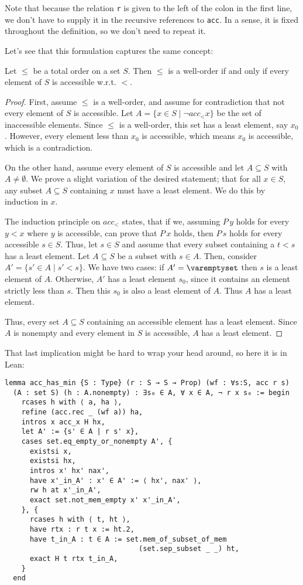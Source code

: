 \documentclass[a4paper, 12pt]{article}
\newcommand{\lean}[1]{\texttt{#1}}
\theoremstyle{changedot}
\theoremstyle{changedotbreak}
\theoremstyle{nonumberplain}
\newtheorem{proof}{Proof}
\begin{document}
Note that because the relation \lean{r} is given to the left of the colon in the first line, we don't have to supply it in the recursive references to \lean{acc}. In a sense, it is fixed throughout the definition, so we don't need to repeat it.

Let's see that this formulation captures the same concept:

\begin{theorem}\label{thm:wf_iff_wo}
  Let $\leq$ be a total order on a set $S$. Then $\leq$ is a well-order if and only if every element of $S$ is accessible w.r.t. $<$.
\end{theorem}
\begin{proof}
  First, assume $\leq$ is a well-order, and assume for contradiction that not every element of $S$ is accessible. Let $A = \{x \in S \mid \neg acc_{<} x\}$ be the set of inaccessible elements. Since $\leq$ is a well-order, this set has a least element, say $x_{0}$. However, every element less than $x_{0}$ is accessible, which means $x_{0}$ is accessible, which is a contradiction.

  On the other hand, assume every element of $S$ is accessible and let $A \subseteq S$ with $A \neq \emptyset$. We prove a slight variation of the desired statement; that for all $x \in S$, any subset $A \subseteq S$ containing $x$ must have a least element. We do this by induction in $x$.

  The induction principle on $acc_{<}$ states, that if we, assuming $P\,y$ holds for every $y < x$ where $y$ is accessible, can prove that $P\, x$ holds, then $P\, s$ holds for every accessible $s \in S$. Thus, let $s \in S$ and assume that every subset containing a $t < s$ has a least element. Let $A \subseteq S$ be a subset with $s \in A$. Then, consider $A' = \{s' \in A \mid s' < s\}$. We have two cases: if $A' = \varemptyset$ then $s$ is a least element of $A$. Otherwise, $A'$ has a least element $s_{0}$, since it contains an element strictly less than $s$. Then this $s_{0}$ is also a least element of $A$. Thus $A$ has a least element.

  Thus, every set $A \subseteq S$ containing an accessible element has a least element. Since $A$ is nonempty and every element in $S$ is accessible, $A$ has a least element.
\end{proof}

That last implication might be hard to wrap your head around, so here it is in Lean:

\begin{verbatim}
lemma acc_has_min {S : Type} (r : S → S → Prop) (wf : ∀s:S, acc r s)
  (A : set S) (h : A.nonempty) : ∃s₀ ∈ A, ∀ x ∈ A, ¬ r x s₀ := begin
    rcases h with ⟨ a, ha ⟩,
    refine (acc.rec _ (wf a)) ha,
    intros x acc_x H hx,
    let A' := {s' ∈ A | r s' x},
    cases set.eq_empty_or_nonempty A', {
      existsi x,
      existsi hx,
      intros x' hx' nax',
      have x'_in_A' : x' ∈ A' := ⟨ hx', nax' ⟩,
      rw h at x'_in_A',
      exact set.not_mem_empty x' x'_in_A',
    }, {
      rcases h with ⟨ t, ht ⟩,
      have rtx : r t x := ht.2,
      have t_in_A : t ∈ A := set.mem_of_subset_of_mem
                                (set.sep_subset _ _) ht,
      exact H t rtx t_in_A,
    }
  end
\end{verbatim}
\end{document}
